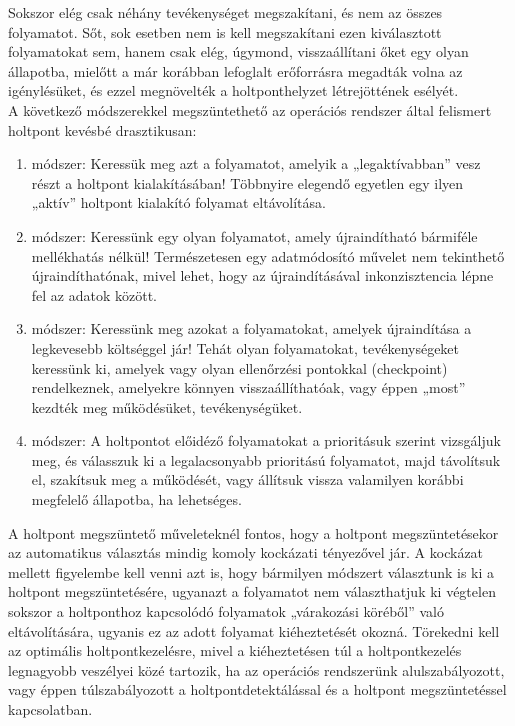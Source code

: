 \documentclass[tikz,12pt,margin=0px]{article}
\begin{document}
    \noindent Sokszor elég csak néhány tevékenységet megszakítani, és nem az összes folyamatot. Sőt, sok esetben nem is kell megszakítani ezen kiválasztott folyamatokat sem, hanem csak elég, úgymond, visszaállítani őket egy olyan állapotba, mielőtt a már korábban lefoglalt erőforrásra megadták volna az igénylésüket, és ezzel megnövelték a holtponthelyzet létrejöttének esélyét.\\
\newpage
    \noindent A következő módszerekkel megszüntethető az operációs rendszer által felismert holtpont kevésbé drasztikusan:
    \begin{enumerate}[topsep=8pt,itemsep=4pt,partopsep=4pt, parsep=4pt]
        \item módszer: Keressük meg azt a folyamatot, amelyik a „legaktívabban” vesz részt a holtpont kialakításában! Többnyire elegendő egyetlen egy ilyen „aktív” holtpont kialakító folyamat eltávolítása.
        \item módszer: Keressünk egy olyan folyamatot, amely újraindítható bármiféle mellékhatás nélkül! Természetesen egy adatmódosító művelet nem tekinthető újraindíthatónak, mivel lehet, hogy az újraindításával inkonzisztencia lépne fel az adatok között.
        \item módszer: Keressünk meg azokat a folyamatokat, amelyek újraindítása a legkevesebb költséggel jár! Tehát olyan folyamatokat, tevékenységeket keressünk ki, amelyek vagy olyan ellenőrzési pontokkal (checkpoint) rendelkeznek, amelyekre könnyen visszaállíthatóak, vagy éppen „most” kezdték meg működésüket, tevékenységüket.
        \item módszer: A holtpontot előidéző folyamatokat a prioritásuk szerint vizsgáljuk meg, és válasszuk ki a legalacsonyabb prioritású folyamatot, majd távolítsuk el, szakítsuk meg a működését, vagy állítsuk vissza valamilyen korábbi megfelelő állapotba, ha lehetséges.
    \end{enumerate}

    \noindent A holtpont megszüntető műveleteknél fontos, hogy a holtpont megszüntetésekor az automatikus választás mindig komoly kockázati tényezővel jár. A kockázat mellett figyelembe kell venni azt is, hogy bármilyen módszert választunk is ki a holtpont megszüntetésére, ugyanazt a folyamatot nem választhatjuk ki végtelen sokszor a holtponthoz kapcsolódó folyamatok „várakozási köréből” való eltávolítására, ugyanis ez az adott folyamat kiéheztetését okozná. Törekedni kell az optimális holtpontkezelésre, mivel a kiéheztetésen túl a holtpontkezelés legnagyobb veszélyei közé tartozik, ha az operációs rendszerünk alulszabályozott, vagy éppen túlszabályozott a holtpontdetektálással és a holtpont megszüntetéssel kapcsolatban.\\
\end{document}
